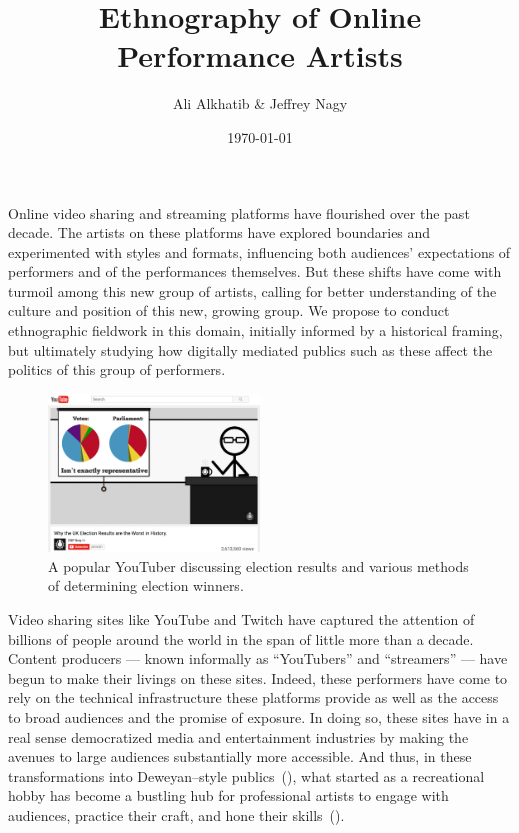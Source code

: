 \documentclass[10pt]{article}
\title{Ethnography of Online Performance Artists}
\author{Ali Alkhatib \& Jeffrey Nagy
}
\date{\today}
\makeatletter
\renewcommand{\maketitle}{\bgroup\setlength{\parindent}{0pt}
\begin{flushleft}
  {\scshape \LARGE \textbf{\@title}}

  \@author
\end{flushleft}\egroup
}
\renewenvironment{abstract}{%
\hfill\begin{minipage}{0.95\textwidth}
\itshape
}
{
\bigskip
\end{minipage}}
\makeatother
\begin{document}
  \maketitle
  \begin{abstract}
  Online video sharing and streaming platforms have flourished over the past decade.
  The artists on these platforms have
  explored boundaries and experimented with styles and formats,
  influencing both audiences' expectations of performers and of the performances themselves.
  But these shifts have come with turmoil among this new group of artists,
  calling for better understanding of the culture and position of this new, growing group.
  We propose to conduct ethnographic fieldwork in this domain,
  initially informed by a historical framing, but
  ultimately studying how digitally mediated publics such as these affect
  the politics of this group of performers.
  \end{abstract}

\begin{figure}
\centering
\includegraphics[width=0.5\textwidth]{figures/cgpgrey.png}
\caption{\label{fig:Magic}A popular YouTuber discussing election results and various methods of determining election winners.}
\end{figure}
Video sharing sites like YouTube and Twitch
have captured the attention of billions of people around the world
in the span of little more than a decade.
Content producers
--- known informally as ``YouTubers'' and ``streamers'' ---
have begun to make their livings on these sites.
Indeed, these performers have come to rely on
the technical infrastructure these platforms provide as well as
the access to broad audiences and the promise of exposure.
In doing so, these sites have in a real sense democratized media and entertainment industries by
making the avenues to large audiences substantially more accessible.
And thus, in these transformations into Deweyan--style publics~(\cite{dewey2012public,disalvo2009design}), what started as
a recreational hobby
has become a bustling hub for professional artists to
engage with audiences,
practice their craft, and 
hone their skills~(\cite{Hamilton:2014:STF:2611105.2557048,Zhang:2015:CIL:2736084.2736091}).
\end{document}
